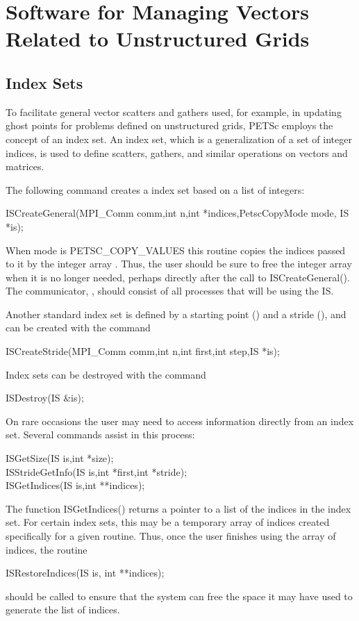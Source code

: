\section{Software for Managing Vectors Related to Unstructured Grids}
\label{sec_unstruct}

\subsection{Index Sets} 
\label{sec_indexset}

To facilitate general vector scatters and gathers used, for example, in updating
ghost points for problems defined on unstructured grids, PETSc employs the
concept of an index set.  An index set, which is a generalization of a
set of integer indices, is used to define scatters, gathers, and similar
operations on vectors and matrices.

The following command creates a index set based on a list
of integers:
\begin{tabbing}
  ISCreateGeneral(MPI\_Comm comm,int n,int *indices,PetscCopyMode mode, IS *is);
\end{tabbing}
When mode is PETSC\_COPY\_VALUES this routine copies the  indices passed
to it by the integer array .
Thus, the user should be sure to free the integer array 
when it is no longer needed, perhaps directly after the call to
ISCreateGeneral(). The communicator, , should consist of all
processes that will be using the IS.

Another standard index set is defined by a starting point () and a
stride (),  and can be created with the command
\begin{tabbing}
  ISCreateStride(MPI\_Comm comm,int n,int first,int step,IS *is);
\end{tabbing}

Index sets can be destroyed with the command
\begin{tabbing}
  ISDestroy(IS \&is);
\end{tabbing}

On rare occasions the user may need to access information directly
from an index set.
Several commands
assist in this process:
\begin{tabbing}
  ISGetSize(IS is,int *size);\\
  ISStrideGetInfo(IS is,int *first,int *stride);\\
  ISGetIndices(IS is,int **indices);
\end{tabbing}
The function ISGetIndices() returns a pointer to a list of the
indices in the index set.
For certain index sets, this may be a
temporary array of indices created specifically for a given routine.
Thus, once the user finishes using the array of indices,
the routine
\begin{tabbing}
  ISRestoreIndices(IS is, int **indices);
\end{tabbing}
should be called to ensure that the system can free the space it
may have used to generate the list of indices.


